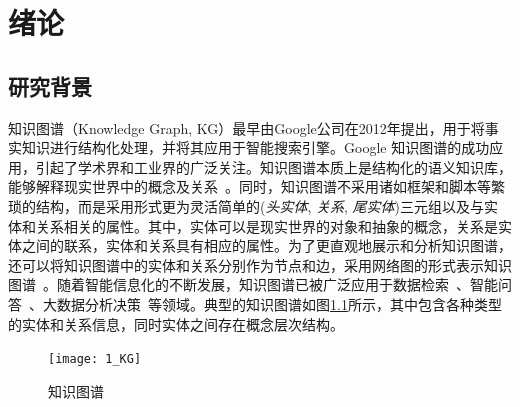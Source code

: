 \documentclass[algorithmlist, AutoFakeBold, AutoFakeSlant, figurelist, tablelist, nomlist, engineering]{seuthesix}
\begin{document}
\tableofcontents
\mainmatter  %

\chapter{绪论}
\section{研究背景}
知识图谱（Knowledge Graph, KG）最早由Google公司在2012年提出，用于将事实知识进行结构化处理，并将其应用于智能搜索引擎。Google 知识图谱的成功应用，引起了学术界和工业界的广泛关注。知识图谱本质上是结构化的语义知识库，能够解释现实世界中的概念及关系~\cite{nickel2015review}。同时，知识图谱不采用诸如框架和脚本等繁琐的结构，而是采用形式更为灵活简单的(\textit{头实体}, \textit{关系}, \textit{尾实体})三元组以及与实体和关系相关的属性。其中，实体可以是现实世界的对象和抽象的概念，关系是实体之间的联系，实体和关系具有相应的属性。为了更直观地展示和分析知识图谱，还可以将知识图谱中的实体和关系分别作为节点和边，采用网络图的形式表示知识图谱~\cite{noy2019industry}。随着智能信息化的不断发展，知识图谱已被广泛应用于数据检索~\cite{rinaldi2021semantic,sarhan2021open,li2021research}、智能问答~\cite{li2021improving,do2021developing}、大数据分析决策~\cite{zhou2021geoscience,abu2021relational}等领域。典型的知识图谱如图\ref{1_KG}所示，其中包含各种类型的实体和关系信息，同时实体之间存在概念层次结构。
\begin{figure}
  \centering
  \texttt{[image: 1\_KG]}
  \caption{知识图谱}
  \label{1_KG}
\end{figure}
\end{document}
